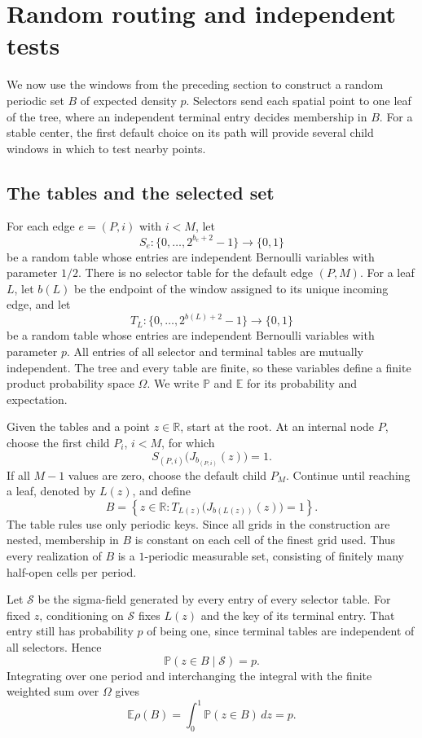 \section{Random routing and independent tests}
\label{sec:routing}

We now use the windows from the preceding section to construct a random
periodic set \(B\) of expected density \(p\).
Selectors send each spatial point to one leaf of the tree, where an
independent terminal entry decides membership in \(B\).
For a stable center, the first default choice on its path will provide
several child windows in which to test nearby points.

\subsection{The tables and the selected set}

For each edge \(e=(P,i)\) with \(i<M\), let
\[
 S_e:\{0,\ldots,2^{b_e+2}-1\}\longrightarrow\{0,1\}
\]
be a random table whose entries are independent Bernoulli variables
with parameter \(1/2\).
There is no selector table for the default edge \((P,M)\).
For a leaf \(L\), let \(b(L)\) be the endpoint of the window assigned
to its unique incoming edge, and let
\[
 T_L:\{0,\ldots,2^{b(L)+2}-1\}\longrightarrow\{0,1\}
\]
be a random table whose entries are independent Bernoulli variables
with parameter \(p\).
All entries of all selector and terminal tables are mutually
independent.  The tree and every table are finite, so these variables
define a finite product probability space \(\Omega\).  We write
\(\mathbb P\) and \(\mathbb E\) for its probability and expectation.

Given the tables and a point \(z\in\mathbb R\), start at the root.
At an internal node \(P\), choose the first child \(P_i\), \(i<M\),
for which
\[
 S_{(P,i)}\bigl(J_{b_{(P,i)}}(z)\bigr)=1.
\]
If all \(M-1\) values are zero, choose the default child \(P_M\).
Continue until reaching a leaf, denoted by \(L(z)\), and define
\begin{equation}
 \label{eq:random-set}
 B=\left\{z\in\mathbb R:
 T_{L(z)}\bigl(J_{b(L(z))}(z)\bigr)=1\right\}.
\end{equation}
The table rules use only periodic keys.  Since all grids in the
construction are nested, membership in \(B\) is constant on each cell
of the finest grid used.  Thus every realization of \(B\) is a
\(1\)-periodic measurable set, consisting of finitely many half-open
cells per period.

Let \(\mathcal S\) be the sigma-field generated by every entry of every
selector table.  For fixed \(z\), conditioning on \(\mathcal S\) fixes
\(L(z)\) and the key of its terminal entry.  That entry still has
probability \(p\) of being one, since terminal tables are independent
of all selectors.  Hence
\[
 \mathbb P(z\in B\mid\mathcal S)=p.
\]
Integrating over one period and interchanging the integral with the
finite weighted sum over \(\Omega\) gives
\begin{equation}
 \label{eq:mean-density}
 \mathbb E\rho(B)=\int_0^1\mathbb P(z\in B)\,dz=p.
\end{equation}

